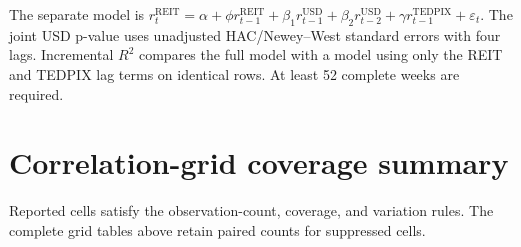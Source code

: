 \documentclass[11pt,a4paper]{article}
\begin{document}
The separate model is $r^{\mathrm{REIT}}_t=\alpha+\phi r^{\mathrm{REIT}}_{t-1}+\beta_1 r^{\mathrm{USD}}_{t-1}+\beta_2 r^{\mathrm{USD}}_{t-2}+\gamma r^{\mathrm{TEDPIX}}_{t-1}+\varepsilon_t$. The joint USD p-value uses unadjusted HAC/Newey--West standard errors with four lags. Incremental $R^2$ compares the full model with a model using only the REIT and TEDPIX lag terms on identical rows. At least 52 complete weeks are required.

\begin{center}
\small
{}
\end{center}

\section{Correlation-grid coverage summary}

Reported cells satisfy the observation-count, coverage, and variation rules. The complete grid tables above retain paired counts for suppressed cells.

\begin{center}
\small
{}
\end{center}
\end{document}
